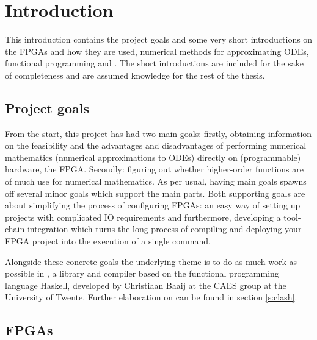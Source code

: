 \chapter{Introduction} 
This introduction contains the project goals and some very short introductions on the FPGAs and how they are used, numerical methods for approximating ODEs, functional programming and \clash{}. The short introductions are included for the sake of completeness and are assumed knowledge for the rest of the thesis.

\section{Project goals}
From the start, this project has had two main goals: firstly, obtaining information on the feasibility and the advantages and disadvantages of performing numerical mathematics (numerical approximations to ODEs) directly on (programmable) hardware, the FPGA. Secondly: figuring out whether higher-order functions are of much use for numerical mathematics. As per usual, having main goals spawns off several minor goals which support the main parts. Both supporting goals are about simplifying the process of configuring FPGAs: an easy way of setting up projects with complicated IO requirements and furthermore, developing a tool-chain integration which turns the long process of compiling and deploying your FPGA project into the execution of a single command.

Alongside these concrete goals the underlying theme is to do as much work as possible in \clash{}, a library and compiler based on the functional programming language Haskell, developed by Christiaan Baaij at the CAES group at the University of Twente. Further elaboration on \clash{} can be found in section \ref{s:clash}.


\section{FPGAs}
